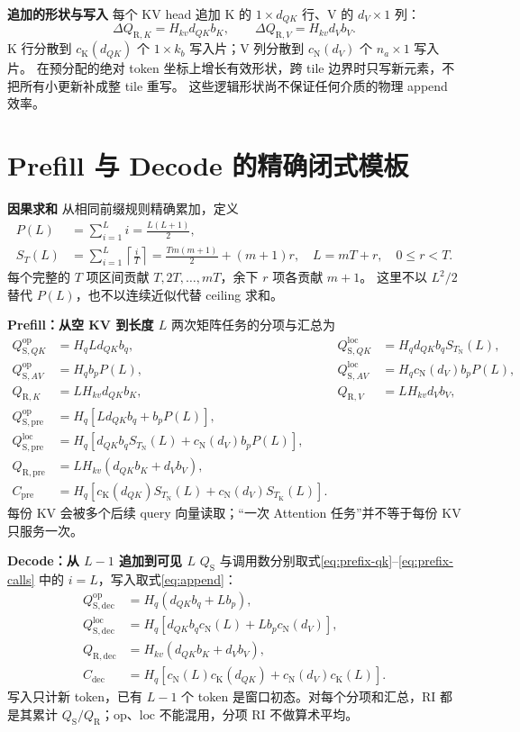 \documentclass[11pt,a4paper,fontset=fandol]{ctexart}
\newcommand{\RI}{\mathrm{RI}}
\newcommand{\op}{\mathrm{op}}
\newcommand{\loc}{\mathrm{loc}}
\newcommand{\cn}[1]{c_{\mathrm N}\!\left(#1\right)}
\newcommand{\ck}[1]{c_{\mathrm K}\!\left(#1\right)}
\newcommand{\tN}{T_{\mathrm N}}
\newcommand{\tK}{T_{\mathrm K}}
\newcommand{\qs}{Q_{\mathrm S}}
\newcommand{\qr}{Q_{\mathrm R}}
\newcommand{\para}[1]{\par\smallskip\noindent\textbf{#1}\quad}
\begin{document}
\para{追加的形状与写入}
每个 KV head 追加 K 的 $1\times d_{QK}$ 行、V 的 $d_V\times1$ 列：
\begin{equation}
\Delta Q_{\mathrm R,K}=H_{kv}d_{QK}b_K,\qquad
\Delta Q_{\mathrm R,V}=H_{kv}d_Vb_V.\label{eq:append}
\end{equation}
K 行分散到 $\ck{d_{QK}}$ 个 $1\times k_b$ 写入片；V 列分散到 $\cn{d_V}$ 个 $n_a\times1$ 写入片。
在预分配的绝对 token 坐标上增长有效形状，跨 tile 边界时只写新元素，不把所有小更新补成整 tile 重写。
这些逻辑形状尚不保证任何介质的物理 append 效率。

\clearpage
\section{Prefill 与 Decode 的精确闭式模板}
\para{因果求和}
从相同前缀规则精确累加，定义
\begin{align}
P(L)&=\sum_{i=1}^{L}i=\frac{L(L+1)}2,\\
S_T(L)&=\sum_{i=1}^{L}\left\lceil\frac iT\right\rceil
       =\frac{Tm(m+1)}2+(m+1)r,\quad L=mT+r,\quad 0\le r<T.\label{eq:st}
\end{align}
每个完整的 $T$ 项区间贡献 $T,2T,\ldots,mT$，余下 $r$ 项各贡献 $m+1$。
这里不以 $L^2/2$ 替代 $P(L)$，也不以连续近似代替 ceiling 求和。

\para{Prefill：从空 KV 到长度 $L$}
两次矩阵任务的分项与汇总为
\begin{align}
Q_{\mathrm S,QK}^{\op}&=H_qLd_{QK}b_q,&
Q_{\mathrm S,QK}^{\loc}&=H_qd_{QK}b_q S_{\tN}(L),\\
Q_{\mathrm S,AV}^{\op}&=H_qb_p P(L),&
Q_{\mathrm S,AV}^{\loc}&=H_q\cn{d_V}b_p P(L),\\
Q_{\mathrm R,K}&=LH_{kv}d_{QK}b_K,&
Q_{\mathrm R,V}&=LH_{kv}d_Vb_V,\\
Q_{\mathrm{S,pre}}^{\op}&=H_q\left[Ld_{QK}b_q+b_pP(L)\right],\\
Q_{\mathrm{S,pre}}^{\loc}&=H_q\left[d_{QK}b_q S_{\tN}(L)+\cn{d_V}b_pP(L)\right],\\
Q_{\mathrm{R,pre}}&=LH_{kv}(d_{QK}b_K+d_Vb_V),\label{eq:pre-r}\\
C_{\mathrm{pre}}&=H_q\left[\ck{d_{QK}}S_{\tN}(L)+\cn{d_V}S_{\tK}(L)\right].
\end{align}
每份 KV 会被多个后续 query 向量读取；“一次 Attention 任务”并不等于每份 KV 只服务一次。

\para{Decode：从 $L-1$ 追加到可见 $L$}
$\qs$ 与调用数分别取式\eqref{eq:prefix-qk}--\eqref{eq:prefix-calls} 中的 $i=L$，写入取式\eqref{eq:append}：
\begin{align}
Q_{\mathrm{S,dec}}^{\op}&=H_q(d_{QK}b_q+Lb_p),\\
Q_{\mathrm{S,dec}}^{\loc}&=H_q\left[d_{QK}b_q\cn{L}+Lb_p\cn{d_V}\right],\\
Q_{\mathrm{R,dec}}&=H_{kv}(d_{QK}b_K+d_Vb_V),\label{eq:dec-r}\\
C_{\mathrm{dec}}&=H_q\left[\cn{L}\ck{d_{QK}}+\cn{d_V}\ck{L}\right].
\end{align}
写入只计新 token，已有 $L-1$ 个 token 是窗口初态。对每个分项和汇总，$\RI$ 都是其累计 $\qs/\qr$；$\op$、$\loc$ 不能混用，分项 RI 不做算术平均。
\end{document}
